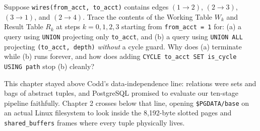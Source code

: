 \begin{exercise}
Suppose \texttt{wires(from\_acct, to\_acct)} contains edges $(1 \to 2)$, $(2 \to 3)$, $(3 \to 1)$, and $(2 \to 4)$. Trace the contents of the Working Table $W_k$ and Result Table $R_k$ at steps $k = 0, 1, 2, 3$ starting from \texttt{from\_acct = 1} for: (a) a query using \texttt{UNION} projecting only \texttt{to\_acct}, and (b) a query using \texttt{UNION ALL} projecting \texttt{(to\_acct, depth)} \emph{without} a cycle guard. Why does (a) terminate while (b) runs forever, and how does adding \texttt{CYCLE to\_acct SET is\_cycle USING path} stop (b) cleanly?
\end{exercise}

This chapter stayed above Codd's data-independence line: relations were sets and bags of abstract tuples, and PostgreSQL promised to evaluate our ten-stage pipeline faithfully. Chapter 2 crosses below that line, opening \texttt{\$PGDATA/base} on an actual Linux filesystem to look inside the 8,192-byte slotted pages and \texttt{shared\_buffers} frames where every tuple physically lives.

\chapterline

